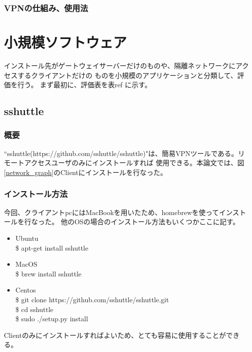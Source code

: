\documentclass[12pt,a4paper,titlepage]{jsarticle}
\begin{document}

\subsubsection{VPNの仕組み、使用法}

\section{小規模ソフトウェア}
インストール先がゲートウェイサーバーだけのものや、隔離ネットワークにアクセスするクライアントだけの
ものを小規模のアプリケーションと分類して、評価を行う。
まず最初に、評価表を表ref に示す。


\subsection{sshuttle}
\subsubsection*{概要}
``sshuttle(https://github.com/sshuttle/sshuttle)"は、簡易VPNツールである。リモートアクセスユーザのみにインストールすれば
    使用できる。本論文では、図\ref{network_graph}のClientにインストールを行なった。
\subsubsection*{インストール方法}
今回、クライアントpcにはMacBookを用いたため、homebrewを使ってインストールを行なった。
他のOSの場合のインストール方法もいくつかここに記す。
\begin{itemize}
    \item Ubuntu \mbox{}\\ \$ apt-get install sshuttle
    \item MacOS \mbox{}\\ \$ brew install sshuttle
    \item Centos \mbox{}\\  \$ git clone https://github.com/sshuttle/sshuttle.git\\\$ cd sshuttle \\ \$ sudo ./setup.py install 
\end{itemize}
Clientのみにインストールすればよいため、とても容易に使用することができる。
\end{document}
